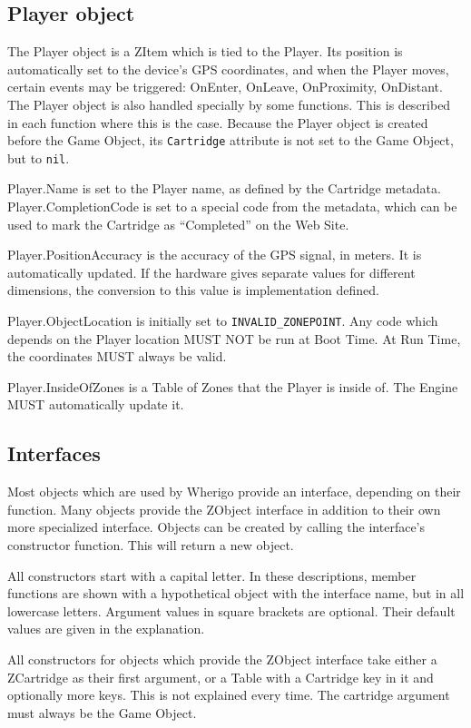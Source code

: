 \documentclass{article}
\begin{document}
\subsection{Player object}
The Player object is a ZItem which is tied to the Player. Its position is
automatically set to the device's GPS coordinates, and when the Player moves,
certain events may be triggered: OnEnter, OnLeave, OnProximity, OnDistant. The
Player object is also handled specially by some functions. This is described in
each function where this is the case.  Because the Player object is created
before the Game Object, its \verb-Cartridge- attribute is not set to the Game
Object, but to \verb-nil-.

Player.Name is set to the Player name, as defined by the Cartridge metadata.
Player.CompletionCode is set to a special code from the metadata, which can be
used to mark the Cartridge as ``Completed'' on the Web Site.

Player.PositionAccuracy is the accuracy of the GPS signal, in meters.  It is automatically updated.  If the hardware gives separate values for different dimensions, the conversion to this value is implementation defined.

Player.ObjectLocation is initially set to \verb-INVALID_ZONEPOINT-.  Any code
which depends on the Player location MUST NOT be run at Boot Time.  At Run
Time, the coordinates MUST always be valid.

Player.InsideOfZones is a Table of Zones that the Player is inside of.  The Engine MUST automatically update it.

\subsection{Interfaces}
Most objects which are used by Wherigo provide an interface, depending on their
function.  Many objects provide the ZObject interface in addition to their own
more specialized interface.  Objects can be created by calling the interface's
constructor function.  This will return a new object.

All constructors start with a capital letter. In these descriptions, member
functions are shown with a hypothetical object with the interface name, but in
all lowercase letters. Argument values in square brackets are optional. Their
default values are given in the explanation.

All constructors for objects which provide the ZObject interface take either a
ZCartridge as their first argument, or a Table with a Cartridge key in it and
optionally more keys. This is not explained every time. The cartridge argument
must always be the Game Object.
\end{document}
